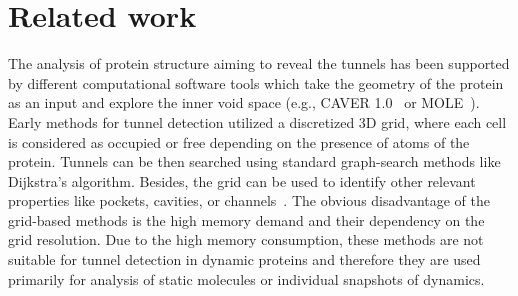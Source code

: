 \documentclass{llncs}
\begin{document}
\section{Related work}

The analysis of protein structure aiming to reveal the tunnels has been supported by different computational software tools which take the geometry of the protein as an input and explore the inner void space (e.g., CAVER 1.0~\cite{citeulike:6257975} or MOLE~\cite{Petrek20071357}). 
Early methods for tunnel detection utilized a discretized 3D grid, where each cell is considered as occupied or free depending
on the presence of atoms of the protein.
Tunnels can be then searched using standard graph-search methods like Dijkstra's algorithm.
Besides, the grid can be used to identify other relevant properties like 
pockets, cavities, or channels~\cite{sehnal2013mole,citeulike:6257975}.
The obvious disadvantage of the grid-based methods is the high memory demand and their dependency on the grid resolution.
Due to the high memory consumption, these methods are not suitable for tunnel detection in dynamic proteins and therefore they
are used primarily for analysis of static molecules or individual snapshots of dynamics.

\end{document}
